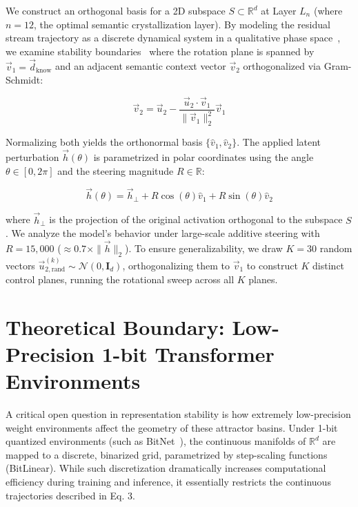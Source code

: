 \documentclass[11pt,a4paper,oneside]{memoir}
\begin{document}
We construct an orthogonal basis for a 2D subspace $S \subset \mathbb{R}^d$ at Layer $L_n$ (where $n = 12$, the optimal semantic crystallization layer). By modeling the residual stream trajectory as a discrete dynamical system in a qualitative phase space~\cite{poincare1899les}, we examine stability boundaries~\cite{lyapunov1892problem} where the rotation plane is spanned by $\vec{v}_1 = \vec{d}_{\text{know}}$ and an adjacent semantic context vector $\vec{v}_2$ orthogonalized via Gram-Schmidt:

\begin{equation}
\vec{v}_2 = \vec{u}_2 - \frac{\vec{u}_2 \cdot \vec{v}_1}{\|\vec{v}_1\|_2^2}\vec{v}_1
\label{eq:gram_schmidt_2}
\end{equation}

Normalizing both yields the orthonormal basis $\{\hat{v}_1, \hat{v}_2\}$. The applied latent perturbation $\vec{h}(\theta)$ is parametrized in polar coordinates using the angle $\theta \in [0, 2\pi]$ and the steering magnitude $R \in \mathbb{R}$:

\begin{equation}
\vec{h}(\theta) = \vec{h}_{\perp} + R \cos(\theta) \hat{v}_1 + R \sin(\theta) \hat{v}_2
\label{eq:perturbation_2}
\end{equation}

where $\vec{h}_{\perp}$ is the projection of the original activation orthogonal to the subspace $S$. We analyze the model's behavior under large-scale additive steering with $R = 15,000$ ($\approx 0.7 \times \|\vec{h}\|_2$). To ensure generalizability, we draw $K = 30$ random vectors $\vec{u}_{2,\text{rand}}^{(k)} \sim \mathcal{N}(0, \mathbf{I}_d)$, orthogonalizing them to $\vec{v}_1$ to construct $K$ distinct control planes, running the rotational sweep across all $K$ planes.

\chapter{Theoretical Boundary: Low-Precision 1-bit Transformer Environments}
\label{sec:bitnet_limitations}
A critical open question in representation stability is how extremely low-precision weight environments affect the geometry of these attractor basins. Under 1-bit quantized environments (such as BitNet~\cite{wang2023bitnet}), the continuous manifolds of $\mathbb{R}^d$ are mapped to a discrete, binarized grid, parametrized by step-scaling functions (BitLinear). While such discretization dramatically increases computational efficiency during training and inference, it essentially restricts the continuous trajectories described in Eq. 3. 
\end{document}

